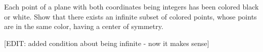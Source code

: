 Each point of a plane with both coordinates being integers has been colored black or white. Show that there exists an infinite subset of colored points, whose points are in the same color, having a center of symmetry.

[EDIT: added condition about being infinite - now it makes sense]